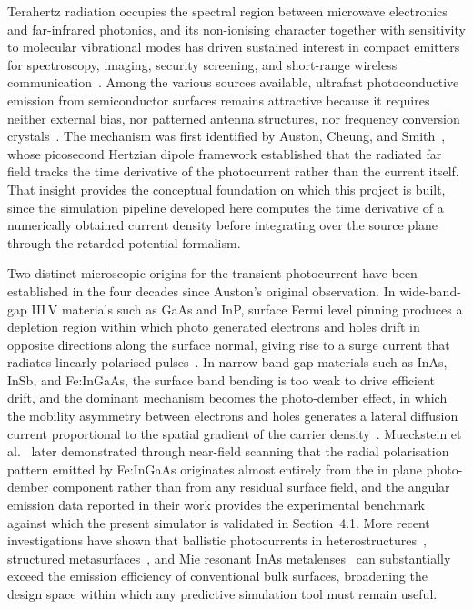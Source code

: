 \documentclass[12pt]{final_project_report}
\begin{document}
Terahertz radiation occupies the spectral region between microwave electronics and far-infrared photonics, and its non-ionising character together with sensitivity to molecular vibrational modes has driven sustained interest in compact emitters for spectroscopy, imaging, security screening, and short-range wireless communication~\cite{Peng2020,Pettine2023}. Among the various sources available, ultrafast photoconductive emission from semiconductor surfaces remains attractive because it requires neither external bias, nor patterned antenna structures, nor frequency conversion crystals~\cite{Apostolopoulos2014,Pettine2023}. The mechanism was first identified by Auston, Cheung, and Smith~\cite{auston_picosecond_1984}, whose picosecond Hertzian dipole framework established that the radiated far field tracks the time derivative of the photocurrent rather than the current itself. That insight provides the conceptual foundation on which this project is built, since the simulation pipeline developed here computes the time derivative of a numerically obtained current density before integrating over the source plane through the retarded-potential formalism.

Two distinct microscopic origins for the transient photocurrent have been established in the four decades since Auston's original observation. In wide-band-gap III\,V materials such as GaAs and InP, surface Fermi level pinning produces a depletion region within which photo generated electrons and holes drift in opposite directions along the surface normal, giving rise to a surge current that radiates linearly polarised pulses~\cite{auston_picosecond_1984,SimulationTHz}. In narrow band gap materials such as InAs, InSb, and Fe:InGaAs, the surface band bending is too weak to drive efficient drift, and the dominant mechanism becomes the photo-dember effect, in which the mobility asymmetry between electrons and holes generates a lateral diffusion current proportional to the spatial gradient of the carrier density~\cite{Reklaitis2010,Klatt2010}. Mueckstein et al.~\cite{Mueckstein2015} later demonstrated through near-field scanning that the radial polarisation pattern emitted by Fe:InGaAs originates almost entirely from the in plane photo-dember component rather than from any residual surface field, and the angular emission data reported in their work provides the experimental benchmark against which the present simulator is validated in Section~4.1. More recent investigations have shown that ballistic photocurrents in heterostructures~\cite{Malevich2021}, structured metasurfaces~\cite{Hale2022}, and Mie resonant InAs metalenses~\cite{Jung2024} can substantially exceed the emission efficiency of conventional bulk surfaces, broadening the design space within which any predictive simulation tool must remain useful.
\end{document}
